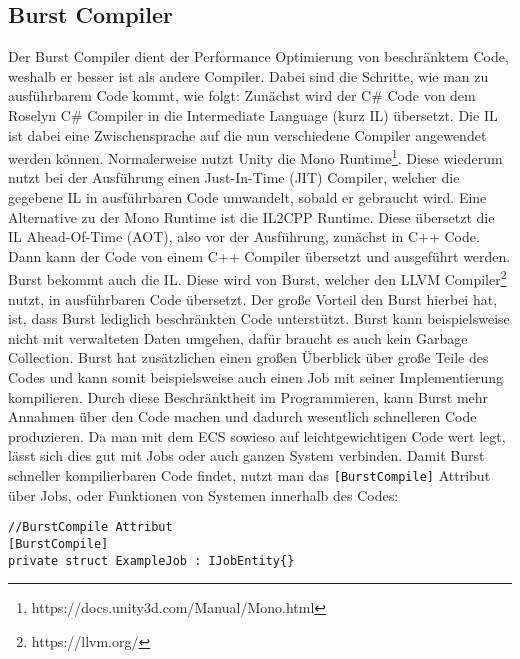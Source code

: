 \subsection{Burst Compiler} \label{burst}
Der Burst Compiler dient der Performance Optimierung von beschränktem Code, weshalb er besser ist als andere Compiler. Dabei sind die Schritte, wie man zu ausführbarem Code kommt,  wie folgt: Zunächst wird der C\# Code von dem Roselyn C\# Compiler in die Intermediate Language (kurz IL) übersetzt. Die IL ist dabei eine Zwischensprache auf die nun verschiedene Compiler angewendet werden können. Normalerweise nutzt Unity die Mono Runtime\footnote{https://docs.unity3d.com/Manual/Mono.html}. Diese wiederum nutzt bei der Ausführung einen Just-In-Time (JIT) Compiler, welcher die gegebene IL in ausführbaren Code umwandelt, sobald er gebraucht wird. Eine Alternative zu der Mono Runtime ist die IL2CPP Runtime. Diese übersetzt die IL Ahead-Of-Time (AOT), also vor der Ausführung, zunächst in C++ Code. Dann kann der Code von einem C++ Compiler übersetzt und ausgeführt werden.\\
Burst bekommt auch die IL. Diese wird von Burst, welcher den LLVM Compiler\footnote{https://llvm.org/} nutzt, in ausführbaren Code übersetzt. Der große Vorteil den Burst hierbei hat, ist, dass Burst lediglich beschränkten Code unterstützt. Burst kann beispielsweise nicht mit  verwalteten Daten umgehen, dafür braucht es auch kein Garbage Collection. Burst hat zusätzlichen einen großen Überblick über große Teile des Codes und kann somit beispielsweise auch einen Job mit seiner Implementierung kompilieren. Durch diese Beschränktheit im Programmieren, kann Burst mehr Annahmen über den Code machen und dadurch wesentlich schnelleren Code produzieren. Da man mit dem ECS sowieso auf leichtgewichtigen Code wert legt, lässt sich dies gut mit Jobs oder auch ganzen System verbinden. Damit Burst schneller kompilierbaren Code findet, nutzt man das \texttt{[BurstCompile]} Attribut über Jobs, oder Funktionen von Systemen innerhalb des Codes:
\begin{lstlisting}[style=code, caption={BurstCompile Attribut, um Burst zu verwenden}]
//BurstCompile Attribut
[BurstCompile]
private struct ExampleJob : IJobEntity{}
\end{lstlisting}
